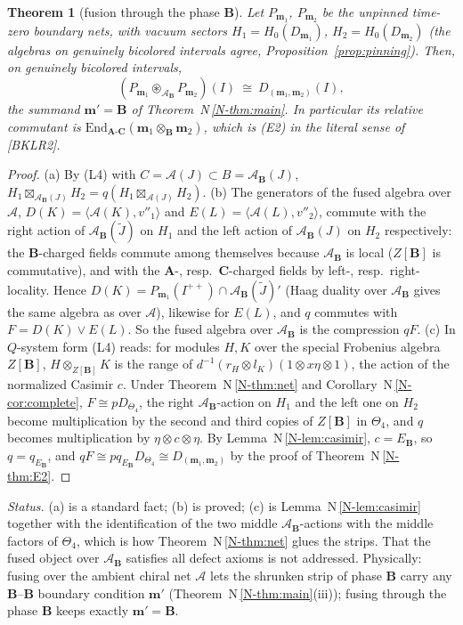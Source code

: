 \documentclass[11pt]{article}
\newtheorem{theorem}{Theorem}[section]
\theoremstyle{definition}
\theoremstyle{remark}
\newcommand{\cA}{\mathcal A}
\newcommand{\bfB}{\mathbf B}
\newcommand{\bfA}{\mathbf A}
\newcommand{\bfC}{\mathbf C}
\newcommand{\fus}{\boxtimes}
\newcommand{\cfus}{\circledast}
\newcommand{\nref}[1]{N\,\ref{N-#1}}
\begin{document}
\begin{theorem}[fusion through the phase $\bfB$]\label{thm:through}
Let $P_{\mathbf m_1}$, $P_{\mathbf m_2}$ be the unpinned time-zero boundary nets, with vacuum sectors $H_1=H_0(D_{\mathbf m_1})$, $H_2=H_0(D_{\mathbf m_2})$ (the algebras on genuinely bicolored intervals agree, Proposition~\ref{prop:pinning}). Then, on genuinely bicolored intervals,
\[
(P_{\mathbf m_1}\cfus_{\cA_{\bfB}}P_{\mathbf m_2})(I)\ \cong\ D_{(\mathbf m_1,\mathbf m_2)}(I),
\]
the summand $\mathbf m'=\bfB$ of Theorem~\nref{thm:main}. In particular its relative commutant is $\mathrm{End}_{\bfA\text{-}\bfC}(\mathbf m_1\otimes_{\bfB}\mathbf m_2)$, which is (E2) in the literal sense of [BKLR2].
\end{theorem}
\begin{proof}
(a) By (L4) with $C=\cA(J)\subset B=\cA_{\bfB}(J)$, $H_1\fus_{\cA_{\bfB}(J)}H_2=q(H_1\fus_{\cA(J)}H_2)$.
(b) The generators of the fused algebra over $\cA$, $D(K)=\langle\cA(K),v''_1\rangle$ and $E(L)=\langle\cA(L),v''_2\rangle$, commute with the right action of $\cA_{\bfB}(\tilde J)$ on $H_1$ and the left action of $\cA_{\bfB}(J)$ on $H_2$ respectively: the $\bfB$-charged fields commute among themselves because $\cA_{\bfB}$ is local ($Z[\bfB]$ is commutative), and with the $\bfA$-, resp.\ $\bfC$-charged fields by left-, resp.\ right-locality. Hence $D(K)=P_{\mathbf m_1}(I^{++})\cap\cA_{\bfB}(\tilde J)'$ (Haag duality over $\cA_{\bfB}$ gives the same algebra as over $\cA$), likewise for $E(L)$, and $q$ commutes with $F=D(K)\vee E(L)$. So the fused algebra over $\cA_{\bfB}$ is the compression $qF$.
(c) In $Q$-system form (L4) reads: for modules $H,K$ over the special Frobenius algebra $Z[\bfB]$, $H\otimes_{Z[\bfB]}K$ is the range of $d^{-1}(r_H\otimes l_K)(1\otimes x\eta\otimes1)$, the action of the normalized Casimir $c$. Under Theorem~\nref{thm:net} and Corollary~\nref{cor:complete}, $F\cong pD_{\Theta_4}$, the right $\cA_{\bfB}$-action on $H_1$ and the left one on $H_2$ become multiplication by the second and third copies of $Z[\bfB]$ in $\Theta_4$, and $q$ becomes multiplication by $\eta\otimes c\otimes\eta$. By Lemma~\nref{lem:casimir}, $c=E_{\bfB}$, so $q=q_{E_{\bfB}}$, and $qF\cong pq_{E_{\bfB}}D_{\Theta_4}\cong D_{(\mathbf m_1,\mathbf m_2)}$ by the proof of Theorem~\nref{thm:E2}.
\end{proof}
\emph{Status.} (a) is a standard fact; (b) is proved; (c) is Lemma~\nref{lem:casimir} together with the identification of the two middle $\cA_{\bfB}$-actions with the middle factors of $\Theta_4$, which is how Theorem~\nref{thm:net} glues the strips. That the fused object over $\cA_{\bfB}$ satisfies all defect axioms is not addressed. Physically: fusing over the ambient chiral net $\cA$ lets the shrunken strip of phase $\bfB$ carry any $\bfB$--$\bfB$ boundary condition $\mathbf m'$ (Theorem~\nref{thm:main}(iii)); fusing through the phase $\bfB$ keeps exactly $\mathbf m'=\bfB$.
\end{document}
